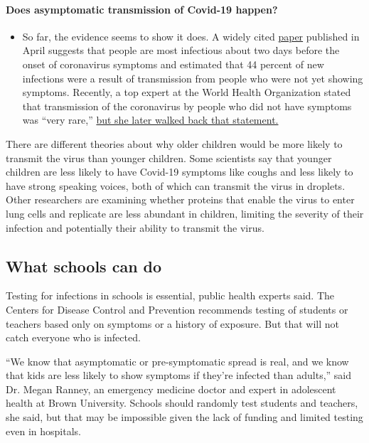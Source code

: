 \begin{itemize}
{  \paragraph{Does asymptomatic transmission of Covid-19
  happen?}\label{does-asymptomatic-transmission-of-covid-19-happen}}

  \begin{itemize}
  \tightlist
  \item
    So far, the evidence seems to show it does. A widely cited
    \href{https://www.nature.com/articles/s41591-020-0869-5}{paper}
    published in April suggests that people are most infectious about
    two days before the onset of coronavirus symptoms and estimated that
    44 percent of new infections were a result of transmission from
    people who were not yet showing symptoms. Recently, a top expert at
    the World Health Organization stated that transmission of the
    coronavirus by people who did not have symptoms was ``very rare,''
    \href{https://www.nytimes3xbfgragh.onion/2020/06/09/world/coronavirus-updates.html?action=click\&pgtype=Article\&state=default\&region=MAIN_CONTENT_3\&context=storylines_faq\#link-1f302e21}{but
    she later walked back that statement.}
  \end{itemize}
\end{itemize}

There are different theories about why older children would be more
likely to transmit the virus than younger children. Some scientists say
that younger children are less likely to have Covid-19 symptoms like
coughs and less likely to have strong speaking voices, both of which can
transmit the virus in droplets. Other researchers are examining whether
proteins that enable the virus to enter lung cells and replicate are
less abundant in children, limiting the severity of their infection and
potentially their ability to transmit the virus.

\hypertarget{what-schools-can-do}{%
\subsection{What schools can do}\label{what-schools-can-do}}

Testing for infections in schools is essential, public health experts
said. The Centers for Disease Control and Prevention recommends testing
of students or teachers based only on symptoms or a history of exposure.
But that will not catch everyone who is infected.

``We know that asymptomatic or pre-symptomatic spread is real, and we
know that kids are less likely to show symptoms if they're infected than
adults,'' said Dr. Megan Ranney, an emergency medicine doctor and expert
in adolescent health at Brown University. Schools should randomly test
students and teachers, she said, but that may be impossible given the
lack of funding and limited testing even in hospitals.

